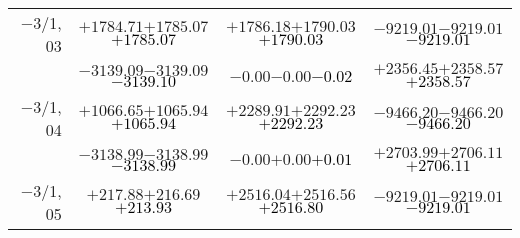 \documentclass[compress]{beamer}
\begin{document}
\begin{frame}
{\begin{tabular}{r | c | c | c}
$-$3/1, 03 & $+1784.71$\hspace{0.1 cm}$+1785.07$\hspace{0.1 cm}\textcolor{black}{$+1785.07$} & $+1786.18$\hspace{0.1 cm}$+1790.03$\hspace{0.1 cm}\textcolor{black}{$+1790.03$} & $-9219.01$\hspace{0.1 cm}$-9219.01$\hspace{0.1 cm}\textcolor{black}{$-9219.01$} \\
           & $-3139.09$\hspace{0.1 cm}$-3139.09$\hspace{0.1 cm}\textcolor{black}{$-3139.10$} & $-0.00$\hspace{0.1 cm}$-0.00$\hspace{0.1 cm}\textcolor{black}{$-0.02$} & $+2356.45$\hspace{0.1 cm}$+2358.57$\hspace{0.1 cm}\textcolor{black}{$+2358.57$} \\
$-$3/1, 04 & $+1066.65$\hspace{0.1 cm}$+1065.94$\hspace{0.1 cm}\textcolor{black}{$+1065.94$} & $+2289.91$\hspace{0.1 cm}$+2292.23$\hspace{0.1 cm}\textcolor{black}{$+2292.23$} & $-9466.20$\hspace{0.1 cm}$-9466.20$\hspace{0.1 cm}\textcolor{black}{$-9466.20$} \\
           & $-3138.99$\hspace{0.1 cm}$-3138.99$\hspace{0.1 cm}\textcolor{black}{$-3138.99$} & $-0.00$\hspace{0.1 cm}$+0.00$\hspace{0.1 cm}\textcolor{black}{$+0.01$} & $+2703.99$\hspace{0.1 cm}$+2706.11$\hspace{0.1 cm}\textcolor{black}{$+2706.11$} \\
$-$3/1, 05 & $+217.88$\hspace{0.1 cm}$+216.69$\hspace{0.1 cm}\textcolor{black}{$+213.93$} & $+2516.04$\hspace{0.1 cm}$+2516.56$\hspace{0.1 cm}\textcolor{black}{$+2516.80$} & $-9219.01$\hspace{0.1 cm}$-9219.01$\hspace{0.1 cm}\textcolor{black}{$-9219.01$} \\

\end{tabular}}
\end{frame}
\end{document}
